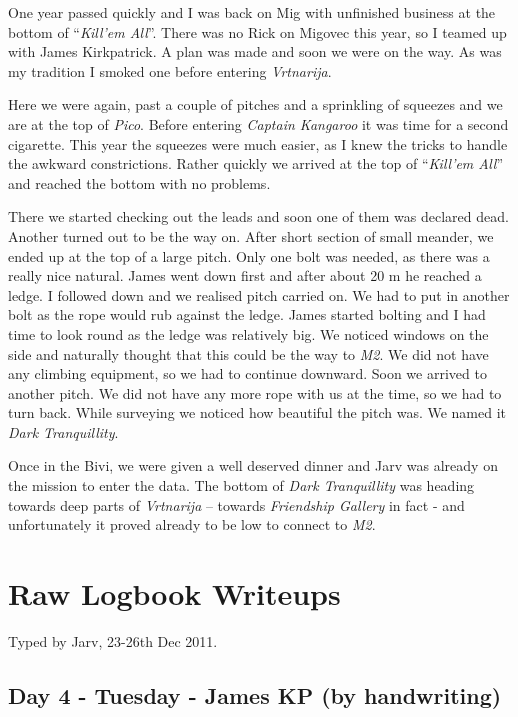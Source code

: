 One year passed quickly and I was back on Mig with unfinished business
at the bottom of ``\emph{Kill'em All}''. There was no Rick on Migovec
this year, so I teamed up with James Kirkpatrick. A plan was made and
soon we were on the way. As was my tradition I smoked one before
entering \emph{Vrtnarija}.

Here we were again, past a couple of pitches and a sprinkling of
squeezes and we are at the top of \emph{Pico}. Before entering
\emph{Captain Kangaroo} it was time for a second cigarette. This year
the squeezes were much easier, as I knew the tricks to handle the
awkward constrictions. Rather quickly we arrived at the top of
``\emph{Kill'em All}'' and reached the bottom with no problems.

There we started checking out the leads and soon one of them was
declared dead. Another turned out to be the way on. After short section
of small meander, we ended up at the top of a large pitch. Only one bolt
was needed, as there was a really nice natural. James went down first
and after about 20 m he reached a ledge. I followed down and we realised
pitch carried on. We had to put in another bolt as the rope would rub
against the ledge. James started bolting and I had time to look round as
the ledge was relatively big. We noticed windows on the side and
naturally thought that this could be the way to \emph{M2}. We did not
have any climbing equipment, so we had to continue downward. Soon we
arrived to another pitch. We did not have any more rope with us at the
time, so we had to turn back. While surveying we noticed how beautiful
the pitch was. We named it \emph{Dark Tranquillity}.

Once in the Bivi, we were given a well deserved dinner and Jarv was
already on the mission to enter the data. The bottom of \emph{Dark
Tranquillity} was heading towards deep parts of \emph{Vrtnarija} --
towards \emph{Friendship Gallery} in fact - and unfortunately it proved
already to be low to connect to \emph{M2}.

\attrib{\izi}

\hypertarget{raw-logbook-writeups}{%
\section{Raw Logbook Writeups}\label{raw-logbook-writeups}}

Typed by Jarv, 23-26th Dec 2011.

\hypertarget{day-4---tuesday---james-kp-by-handwriting}{%
\subsection{Day 4 - Tuesday - James KP (by
handwriting)}\label{day-4---tuesday---james-kp-by-handwriting}}

